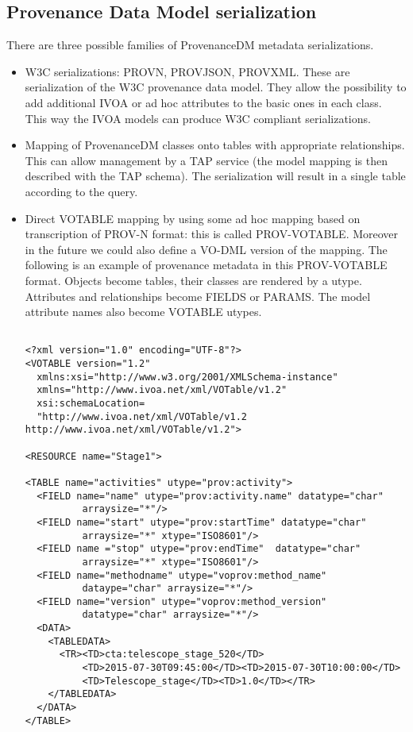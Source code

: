 \subsection{Provenance Data Model serialization}
There are three possible families of ProvenanceDM metadata serializations.
\begin{itemize}
 \item W3C serializations: PROV\-N, PROV\-JSON, PROV\-XML. These are serialization of the W3C provenance data model. They allow the possibility to add additional IVOA or ad hoc attributes to the basic ones in each class. This way the IVOA models can produce W3C compliant serializations.
 \item Mapping of ProvenanceDM classes onto tables with appropriate relationships. This can allow management by a TAP service (the model mapping is then described with the TAP schema). The serialization will result in a single table according to the query.


 \item Direct VOTABLE mapping by using some ad hoc mapping based on transcription of PROV-N format: this is called PROV-VOTABLE. Moreover in the future we could also define a VO-DML \citep{std:VODML} version of the mapping.
The following is an example of provenance metadata in this PROV-VOTABLE format. Objects become tables, their classes are rendered by a utype. Attributes and relationships become FIELDS or PARAMS. The model attribute names also become VOTABLE utypes.  
\begin{verbatim}

<?xml version="1.0" encoding="UTF-8"?>
<VOTABLE version="1.2" 
  xmlns:xsi="http://www.w3.org/2001/XMLSchema-instance"
  xmlns="http://www.ivoa.net/xml/VOTable/v1.2"
  xsi:schemaLocation=
  "http://www.ivoa.net/xml/VOTable/v1.2 http://www.ivoa.net/xml/VOTable/v1.2">

<RESOURCE name="Stage1">

<TABLE name="activities" utype="prov:activity">
  <FIELD name="name" utype="prov:activity.name" datatype="char" 
          arraysize="*"/>
  <FIELD name="start" utype="prov:startTime" datatype="char" 
          arraysize="*" xtype="ISO8601"/>
  <FIELD name ="stop" utype="prov:endTime"  datatype="char" 
          arraysize="*" xtype="ISO8601"/>
  <FIELD name="methodname" utype="voprov:method_name" 
          dataype="char" arraysize="*"/>
  <FIELD name="version" utype="voprov:method_version" 
          datatype="char" arraysize="*"/>  
  <DATA>
    <TABLEDATA>
      <TR><TD>cta:telescope_stage_520</TD>
          <TD>2015-07-30T09:45:00</TD><TD>2015-07-30T10:00:00</TD>
          <TD>Telescope_stage</TD><TD>1.0</TD></TR>
    </TABLEDATA>
  </DATA>      
</TABLE>


\end{verbatim}
\end{itemize}
